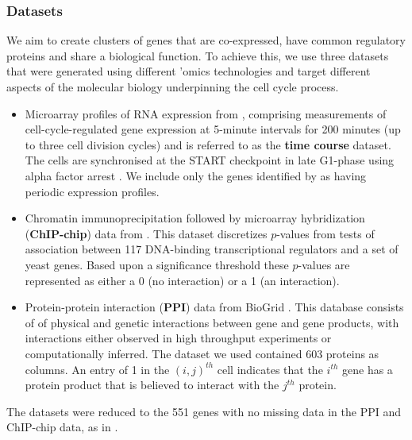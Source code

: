 \documentclass[12pt]{article}
\begin{document}
\subsubsection{Datasets}
We aim to create clusters of genes that are co-expressed, have common regulatory proteins and share a biological function. To achieve this, we use three datasets that were generated using different 'omics technologies and target different aspects of the molecular biology underpinning the cell cycle process.
\begin{itemize}
	\item Microarray profiles of RNA expression from \cite{granovskaia2010high}, comprising measurements of cell-cycle-regulated gene expression at 5-minute intervals for 200 minutes (up to three cell division cycles) and is referred to as the \textbf{time course} dataset. The cells are synchronised at the START checkpoint in late G1-phase using alpha factor arrest
	\citep{granovskaia2010high}. We include only the genes identified by \cite{granovskaia2010high} as having periodic expression profiles.
	\item Chromatin immunoprecipitation followed by microarray hybridization (\textbf{ChIP-chip}) data from \cite{harbison2004transcriptional}. This dataset discretizes $p$-values from tests of association between 117 DNA-binding transcriptional regulators and a set of yeast genes. Based upon a significance threshold these $p$-values are represented as either a 0 (no interaction) or a 1 (an interaction).
	\item Protein-protein interaction (\textbf{PPI}) data from BioGrid \citep{stark2006biogrid}. This database consists of of physical and genetic interactions between gene and gene products, with interactions either observed in high throughput experiments or computationally inferred. The dataset we used contained 603 proteins as columns. An entry of 1 in the $(i, j)^{th}$ cell indicates that the $i^{th}$ gene has a protein product that is believed to interact with the $j^{th}$ protein.
\end{itemize}
The datasets were reduced to the 551 genes with no missing data in the PPI and ChIP-chip data, as in \cite{kirk2012bayesian}. 
\end{document}
